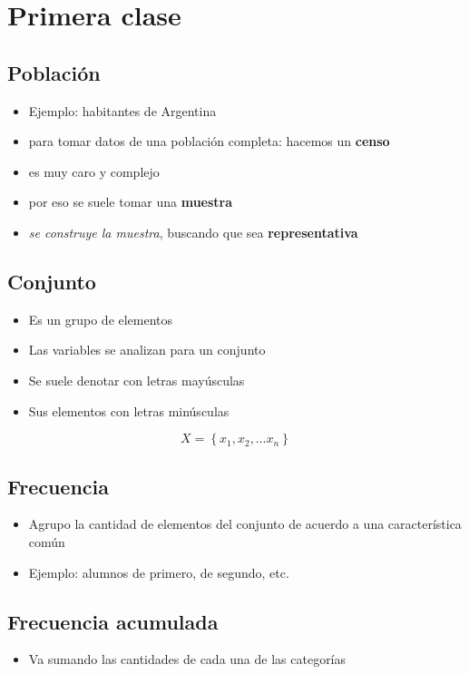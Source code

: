 \section{Primera clase}

\subsection{Población}

\begin{itemize}
    \item Ejemplo: habitantes de Argentina
    \item para tomar datos de una población completa: hacemos un \textbf{censo}
    \item es muy caro y complejo
    \item por eso se suele tomar una \textbf{muestra}
    \item \textit{se construye la muestra}, buscando que 
    sea \textbf{representativa}
\end{itemize}

\subsection{Conjunto}
\begin{itemize}
    \item Es un grupo de elementos
    \item Las variables se analizan para un conjunto
    \item Se suele denotar con letras mayúsculas
    \item Sus elementos con letras minúsculas
\end{itemize}

\begin{equation*}
    X = \left\{x_1, x_2, \dots x_n\right\}
\end{equation*}

\subsection{Frecuencia}
\begin{itemize}
    \item Agrupo la cantidad de elementos del conjunto de acuerdo a una 
    característica común
    \item Ejemplo: alumnos de primero, de segundo, etc.
\end{itemize}

\subsection{Frecuencia acumulada}
\begin{itemize}
    \item Va sumando las cantidades de cada una de las categorías
\end{itemize}

